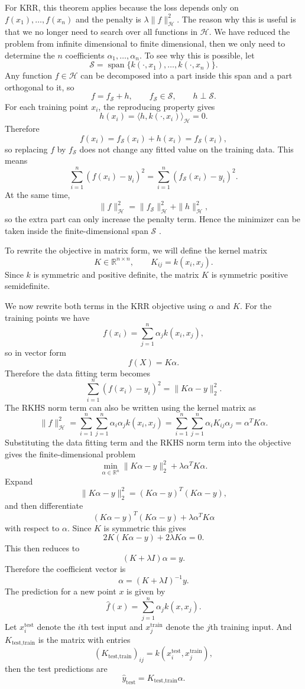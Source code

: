For KRR, this theorem applies because the loss depends only on $f(x_1),\ldots,f(x_n)$ and the penalty is $\lambda\|f\|_{\mathcal H}^2$. The reason why this is useful is that we no longer need to search over all functions in $\mathcal{H}$. We have reduced the problem from infinite dimensional to finite dimensional, then we only need to determine the $n$ coefficients $\alpha_1,\ldots,\alpha_n$. To see why this is possible, let
\[
\mathcal S=\operatorname{span}\{k(\cdot,x_1),\ldots,k(\cdot,x_n)\}.
\]
Any function $f\in\mathcal H$ can be decomposed into a part inside this span and a part orthogonal to it, so
\[
f=f_{\mathcal S}+h,\qquad f_{\mathcal S}\in\mathcal S,\qquad h\perp \mathcal S.
\]
For each training point $x_i$, the reproducing property gives
\[
h(x_i)=\langle h,k(\cdot,x_i)\rangle_{\mathcal H}=0.
\]
Therefore
\[
f(x_i)=f_{\mathcal S}(x_i)+h(x_i)=f_{\mathcal S}(x_i),
\]
so replacing $f$ by $f_{\mathcal S}$ does not change any fitted value on the training data. This means
\[
\sum_{i=1}^n(f(x_i)-y_i)^2 =\sum_{i=1}^n(f_{\mathcal S}(x_i)-y_i)^2.
\]
At the same time,
\[
\|f\|_{\mathcal H}^2=\|f_{\mathcal S}\|_{\mathcal H}^2+\|h\|_{\mathcal H}^2,
\]
so the extra part can only increase the penalty term. Hence the minimizer can be taken inside the finite-dimensional span $\mathcal S$ \citep{scholkopf2001generalized,zhu2023rkhs}.

To rewrite the objective in matrix form, we will define the kernel matrix
\[
K\in\mathbb{R}^{n\times n},\qquad K_{ij}=k(x_i,x_j).
\]
Since $k$ is symmetric and positive definite, the matrix $K$ is symmetric positive semidefinite.

We now rewrite both terms in the KRR objective using $\alpha$ and $K$. For the training points we have
\[
f(x_i)=\sum_{j=1}^n\alpha_j k(x_i,x_j),
\]
so in vector form
\[
f(X)=K\alpha.
\]
Therefore the data fitting term becomes
\[
\sum_{i=1}^n(f(x_i)-y_i)^2=\|K\alpha-y\|_2^2.
\]
The RKHS norm term can also be written using the kernel matrix as
\[
\|f\|_{\mathcal{H}}^2=\sum_{i=1}^n\sum_{j=1}^n\alpha_i\alpha_j k(x_i,x_j)=\sum_{i=1}^n\sum_{j=1}^n \alpha_i K_{ij}\alpha_j=\alpha^T K\alpha.
\]
Substituting the data fitting term and the RKHS norm term into the objective gives the finite-dimensional problem
\[
\min_{\alpha\in\mathbb{R}^n}\|K\alpha-y\|_2^2+\lambda\alpha^T K\alpha.
\]
Expand
\[
\|K\alpha-y\|_2^2=(K\alpha-y)^T(K\alpha-y),
\]
and then differentiate
\[
(K\alpha-y)^T(K\alpha-y)+\lambda\alpha^T K\alpha
\]
with respect to $\alpha$. Since $K$ is symmetric this gives
\[
2K(K\alpha-y)+2\lambda K\alpha=0.
\]
This then reduces to
\[
(K+\lambda I)\alpha=y.
\]
Therefore the coefficient vector is
\[
\alpha=(K+\lambda I)^{-1}y.
\]
The prediction for a new point $x$ is given by
\[
\hat f(x)=\sum_{j=1}^n\alpha_j k(x,x_j).
\]
Let $x_i^{\mathrm{test}}$ denote the $i$th test input and $x_j^{\mathrm{train}}$ denote the $j$th training input. And $K_{\text{test},\text{train}}$ is the matrix with entries
\[
(K_{\text{test},\text{train}})_{ij}=k(x_i^{\text{test}},x_j^{\text{train}}),
\]
then the test predictions are
\[
\hat y_{\text{test}}=K_{\text{test},\text{train}}\alpha.
\]

